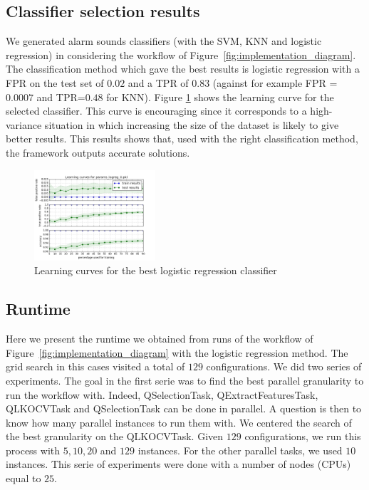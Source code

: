 \documentclass[10pt, conference, compsocconf]{IEEEtran}
\begin{document}
\subsection{Classifier selection results}
We generated alarm sounds classifiers (with the SVM, KNN and logistic regression) in considering the workflow of 
Figure~\ref{fig:implementation_diagram}. 
The classification method which gave the best results is logistic regression with a FPR on the test set of $0.02$ and a TPR of $0.83$ (against for example FPR = $0.0007$ and TPR=$0.48$ for KNN). Figure \ref{fig:learning_curve} shows the learning curve for the selected classifier. This curve is encouraging since it corresponds to a high-variance situation in which increasing the size of the dataset is likely to give better results. This results shows that, used with the right classification method, the framework outputs accurate solutions. 
\begin{figure}[h]
  \centering
  \includegraphics[width=0.4\textwidth]{Figures/learning_curve_logreg0_newdata.png}
  \caption{Learning curves for the best logistic regression classifier \label{fig:learning_curve}}
\end{figure}

\subsection{Runtime}
Here we present the runtime we obtained from runs of the workflow of Figure~\ref{fig:implementation_diagram} with the logistic 
regression method. The grid search in this cases visited a total of $129$ configurations. We did two series of experiments. 
The goal in the first serie was to find the best parallel granularity to run the workflow with. Indeed, 
QSelectionTask, QExtractFeaturesTask, QLKOCVTask and QSelectionTask can be done in parallel. A question is then to know how 
many parallel instances to run them with. We centered the search of the best granularity on the QLKOCVTask. 
Given $129$ configurations, we run this process with $5, 10, 20$ and $129$ instances. For the other parallel tasks, 
we used $10$ instances. This serie of experiments were done with a number of nodes (CPUs) equal to $25$. 
\end{document}
